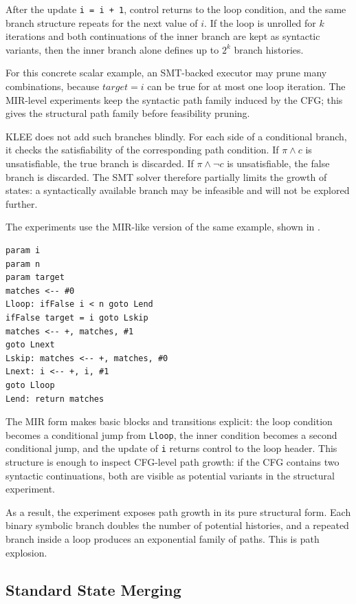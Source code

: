 \documentclass[conference]{IEEEtran}
\begin{document}
After the update \texttt{i = i + 1}, control returns to the loop condition, and
the same branch structure repeats for the next value of \(i\). If the loop is
unrolled for \(k\) iterations and both continuations of the inner branch are
kept as syntactic variants, then the inner branch alone defines up to \(2^k\)
branch histories.

For this concrete scalar example, an SMT-backed executor may prune many
combinations, because \(\mathit{target} = i\) can be true for at most one loop
iteration. The MIR-level experiments keep the syntactic path family induced by
the CFG; this gives the structural path family before feasibility pruning.

KLEE does not add such branches blindly. For each side of a conditional branch,
it checks the satisfiability of the corresponding path condition. If
\(\pi \land c\) is unsatisfiable, the true branch is discarded. If
\(\pi \land \lnot c\) is unsatisfiable, the false branch is discarded. The SMT
solver therefore partially limits the growth of states: a syntactically
available branch may be infeasible and will not be explored further.

The experiments use the MIR-like version of the same example, shown in
.

\begin{lstlisting}[style=mirfull,caption={MIR form of the repeated-branch loop.},label={lst:mir-count-matches}]
param i
param n
param target
matches <-- #0
Lloop: ifFalse i < n goto Lend
ifFalse target = i goto Lskip
matches <-- +, matches, #1
goto Lnext
Lskip: matches <-- +, matches, #0
Lnext: i <-- +, i, #1
goto Lloop
Lend: return matches
\end{lstlisting}

The MIR form makes basic blocks and transitions explicit: the loop condition
becomes a conditional jump from \texttt{Lloop}, the inner condition becomes a
second conditional jump, and the update of \texttt{i} returns control to the
loop header. This structure is enough to inspect CFG-level path growth: if the
CFG contains two syntactic continuations, both are visible as potential
variants in the structural experiment.

As a result, the experiment exposes path growth in its pure structural form.
Each binary symbolic branch doubles the number of potential histories, and a
repeated branch inside a loop produces an exponential family of paths. This is
path explosion.

\subsection{Standard State Merging}
\label{sec:state-merging}
\end{document}
